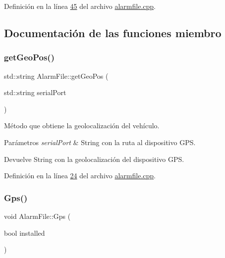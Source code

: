 Definición en la línea \hyperlink{alarmfile_8cpp_source_l00045}{45} del archivo \hyperlink{alarmfile_8cpp_source}{alarmfile.\+cpp}.



\subsection{Documentación de las funciones miembro}
\mbox{\label{classAlarmFile_a4865f7e404e938960e45b7e805956401}} 
\subsubsection{\texorpdfstring{get\+Geo\+Pos()}{getGeoPos()}}
{\footnotesize\ttfamily std\+::string Alarm\+File\+::get\+Geo\+Pos (\begin{DoxyParamCaption}\item[{std\+::string}]{serial\+Port }\end{DoxyParamCaption})}



Método que obtiene la geolocalización del vehículo. 


\begin{DoxyParams}{Parámetros}
{\em serial\+Port} & String con la ruta al dispositivo G\+PS. \\
\hline
\end{DoxyParams}
\begin{DoxyReturn}{Devuelve}
String con la geolocalización del dispositivo G\+PS. 
\end{DoxyReturn}


Definición en la línea \hyperlink{alarmfile_8cpp_source_l00024}{24} del archivo \hyperlink{alarmfile_8cpp_source}{alarmfile.\+cpp}.

\mbox{\label{classAlarmFile_acfb3c406818e76439ba47aa539178f7d}} 
\subsubsection{\texorpdfstring{Gps()}{Gps()}}
{\footnotesize\ttfamily void Alarm\+File\+::\+Gps (\begin{DoxyParamCaption}\item[{bool}]{installed }\end{DoxyParamCaption})}



